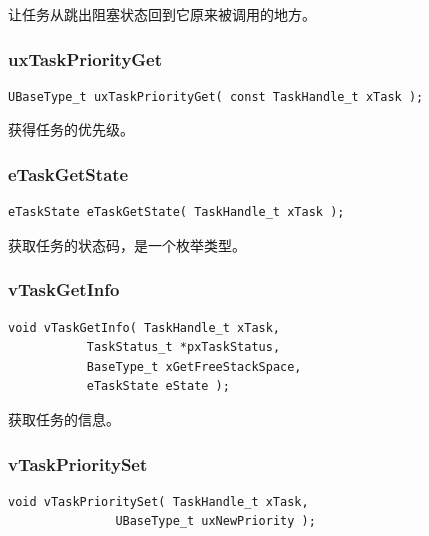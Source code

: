 \documentclass[12pt, a4paper]{article}
\begin{document}
让任务从跳出阻塞状态回到它原来被调用的地方。

\subsubsection {uxTaskPriorityGet}

\begin{lstlisting}[language={[ANSI]C},keywordstyle=\color{blue!70},commentstyle=\color{red!50!green!50!blue!50},frame=shadowbox, rulesepcolor=\color{red!20!green!20!blue!20}]
UBaseType_t uxTaskPriorityGet( const TaskHandle_t xTask );
\end{lstlisting}

获得任务的优先级。

\subsubsection {eTaskGetState}

\begin{lstlisting}[language={[ANSI]C},keywordstyle=\color{blue!70},commentstyle=\color{red!50!green!50!blue!50},frame=shadowbox, rulesepcolor=\color{red!20!green!20!blue!20}]
eTaskState eTaskGetState( TaskHandle_t xTask );
\end{lstlisting}

获取任务的状态码，是一个枚举类型。

\subsubsection {vTaskGetInfo}

\begin{lstlisting}[language={[ANSI]C},keywordstyle=\color{blue!70},commentstyle=\color{red!50!green!50!blue!50},frame=shadowbox, rulesepcolor=\color{red!20!green!20!blue!20}]
void vTaskGetInfo( TaskHandle_t xTask, 
		   TaskStatus_t *pxTaskStatus,
		   BaseType_t xGetFreeStackSpace,
		   eTaskState eState );
\end{lstlisting}

获取任务的信息。

\subsubsection {vTaskPrioritySet}

\begin{lstlisting}[language={[ANSI]C},keywordstyle=\color{blue!70},commentstyle=\color{red!50!green!50!blue!50},frame=shadowbox, rulesepcolor=\color{red!20!green!20!blue!20}]
void vTaskPrioritySet( TaskHandle_t xTask,
		       UBaseType_t uxNewPriority );
\end{lstlisting}
\end{document}
